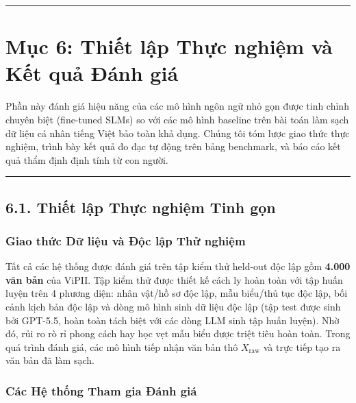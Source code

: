 \documentclass[
  11pt,
  a4paper,
]{article}
\begin{document}
\begin{center}\rule{0.5\linewidth}{0.5pt}\end{center}

\section{Mục 6: Thiết lập Thực nghiệm và Kết quả Đánh
giá}\label{mux1ee5c-6-thiux1ebft-lux1eadp-thux1ef1c-nghiux1ec7m-vuxe0-kux1ebft-quux1ea3-ux111uxe1nh-giuxe1}

Phần này đánh giá hiệu năng của các mô hình ngôn ngữ nhỏ gọn được tinh chỉnh chuyên biệt (fine-tuned
SLMs) so với các mô hình baseline trên bài toán làm sạch dữ liệu cá nhân tiếng Việt bảo toàn khả
dụng. Chúng tôi tóm lược giao thức thực nghiệm, trình bày kết quả đo đạc tự động trên bảng
benchmark, và báo cáo kết quả thẩm định định tính từ con người.

\begin{center}\rule{0.5\linewidth}{0.5pt}\end{center}

\subsection{6.1. Thiết lập Thực nghiệm Tinh
gọn}\label{thiux1ebft-lux1eadp-thux1ef1c-nghiux1ec7m-tinh-gux1ecdn}

\subsubsection{Giao thức Dữ liệu và Độc lập Thử
nghiệm}\label{giao-thux1ee9c-dux1eef-liux1ec7u-vuxe0-ux111ux1ed9c-lux1eadp-thux1eed-nghiux1ec7m}

Tất cả các hệ thống được đánh giá trên tập kiểm thử held-out độc lập gồm \textbf{4.000 văn bản} của
ViPII. Tập kiểm thử được thiết kế cách ly hoàn toàn với tập huấn luyện trên 4 phương diện: nhân
vật/hồ sơ độc lập, mẫu biểu/thủ tục độc lập, bối cảnh kịch bản độc lập và dòng mô hình sinh dữ liệu
độc lập (tập test được sinh bởi GPT-5.5, hoàn toàn tách biệt với các dòng LLM sinh tập huấn luyện).
Nhờ đó, rủi ro rò rỉ phong cách hay học vẹt mẫu biểu được triệt tiêu hoàn toàn. Trong quá trình đánh
giá, các mô hình tiếp nhận văn bản thô \(X_{\text{raw}}\) và trực tiếp tạo ra văn bản đã làm sạch.

\subsubsection{Các Hệ thống Tham gia Đánh
giá}\label{cuxe1c-hux1ec7-thux1ed1ng-tham-gia-ux111uxe1nh-giuxe1}
\end{document}
